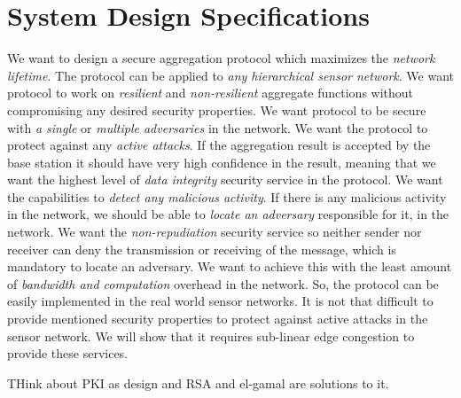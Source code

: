 
\section{System Design Specifications}
	We want to design a secure aggregation protocol which maximizes the \textit{network lifetime}.
	The protocol can be applied to \textit{any hierarchical sensor network}.
	We want protocol to work on \textit{resilient} and \textit{non-resilient} aggregate functions without compromising any desired security properties.
	We want protocol to be secure with \textit{a single} or \textit{multiple adversaries} in the network.
	\label{subsec:security benefits of signing the data-item}	We want the protocol to protect against any \textit{active attacks}. 
	If the aggregation result is accepted by the base station it should have very high confidence in the result, meaning that we want the highest level of \textit{data integrity} security service in the protocol.
	We want the capabilities to \textit{detect any malicious activity}.
	If there is any malicious activity in the network, we should be able to \textit{locate an adversary} responsible for it, in the network.
	We want the \textit{non-repudiation} security service so neither sender nor receiver can deny the transmission or receiving of the message, which is mandatory to locate an adversary.
	We want to achieve this with the least amount of \textit{bandwidth and computation} overhead in the network.
	So, the protocol can be easily implemented in the real world sensor networks.
	It is not that difficult to provide mentioned security properties to protect against active attacks in the sensor network. 
	We will show that it requires sub-linear edge congestion to provide these services. 

	THink about PKI as design and RSA and el-gamal are solutions to it.






